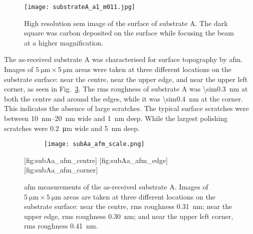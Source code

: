 \begin{figure}[htbp]
    \centering
    \texttt{[image: substrateA\_a1\_m011.jpg]}
    \caption[\Ac{sem} image of surface scratches on substrate A.]{High resolution \ac{sem} image of the surface of substrate A. The dark square was carbon deposited on the surface while focusing the beam at a higher magnification.}\label{fig:subAa_scratches}
    \label{fig:SEM_A_surface}
\end{figure}

The as-received substrate A was characterised for surface topography by \ac{afm}. Images of $\SI{5}{\micro\metre}\times\SI{5}{\micro\metre}$ areas were taken at three different locations on the substrate surface: near the centre, near the upper edge, and near the upper left corner, as seen in Fig.~\ref{fig:subAa_afm}. The \ac{rms} roughness of substrate A was \SI{\sim0.3}{\nano\metre} at both the centre and around the edges, while it was \SI{\sim0.4}{\nano\metre} at the corner. This indicates the absence of large scratches. The typical surface scratches were between \SIrange{10}{20}{\nano\metre} wide and \SI{1}{\nano\metre} deep. While the largest polishing scratches were \SI{0.2}{\micro\metre} wide and \SI{5}{\nano\metre} deep.

\begin{figure}[htbp]
    \centering
    \begin{subfigure}[c]{0.032\linewidth}
        \label{fig:subAa_afm_scale}\captionsetup{list=no}
        \texttt{[image: subAa\_afm\_scale.png]}
    \end{subfigure}
    \hfill
    [fig:subAa_afm_centre]
    \hfill
    [fig:subAa_afm_edge]%
    \hfill
    [fig:subAa_afm_corner]%
    \caption[\Ac{afm} of as-received substrate A.]{\Ac{afm} measurements of the as-received substrate A. Images of $\SI{5}{\micro\metre}\times\SI{5}{\micro\metre}$ areas are taken at three different locations on the substrate surface:  near the centre, \ac{rms} roughness \SI{0.31}{\nano\metre};  near the upper edge, \ac{rms} roughness \SI{0.30}{\nano\metre}; and  near the upper left corner, \ac{rms} roughness \SI{0.41}{\nano\metre}.}\label{fig:subAa_afm}
\end{figure} %

